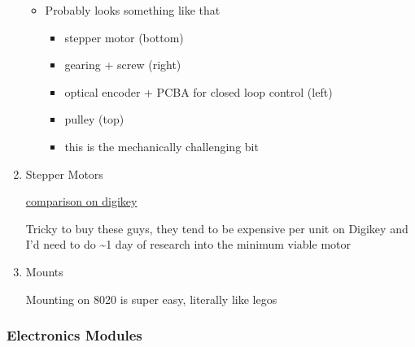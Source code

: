 \documentclass[11pt]{article}
\begin{document}
\begin{enumerate}
\begin{itemize}
\item Probably looks something like that
\begin{itemize}
\item stepper motor (bottom)
\item gearing + screw (right)
\item optical encoder + PCBA for closed loop control (left)
\item pulley (top)
\item this is the mechanically challenging bit
\end{itemize}
\end{itemize}

\item Stepper Motors
\label{sec:org14582fc}

\href{https://www.digikey.com/en/products/compare?s=N4IgzCBcDaIEwBYCMB2ADHArCANCBAHAmAlriJgJyWZoqXkBsmBBmKKIAunglCAHoApgDsBABwBOAewAmAVwDGAFwDOAgGYBLADbKhkgav3jxBgLQBbacumT1qSgH5VAXgByCAJIBzAFYAwgBCitIAogAeSNIAIgDiAKpBlkExAILuPgBaAO4A0gCaQdIAikEoeWkARgBKQT4AEgVFlmFplmkAaj5pWQCGAWkA8gCyGX7iAdLiBNKKJWkAGiVeaQ1pAZglC1klANZpImkAUgVpKMMFPQBuPgAqaUFD7n6lABZ7e7LuIhEAYgBlLzHLR5NA9ZQxMIABTify6YGhfy8WSCflk11k0i8NQWdz6d1UOWOPjeETyCR8JQaPgOdwAXmFFASSqosmk0O5ViAAL5AA}{comparison on digikey}

Tricky to buy these guys, they tend to be expensive per unit on Digikey and I'd need to do \textasciitilde{}1 day of research into the minimum viable motor

\item Mounts
\label{sec:orgd3799a9}

Mounting on 8020 is super easy, literally like legos
\end{enumerate}

\subsubsection{Electronics Modules}
\label{sec:org7b5ff25}
\end{document}
